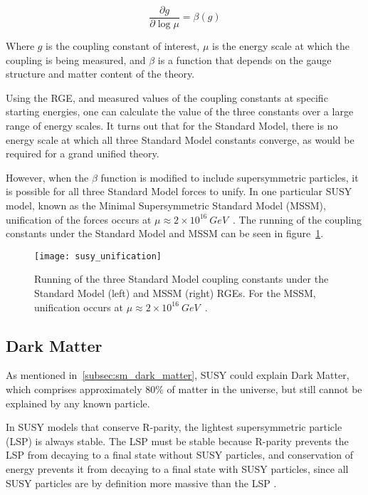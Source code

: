 \begin{equation}\label{eq:renorm_group}
    \frac{\partial g}{\partial \log \mu} = \beta(g)
\end{equation}

Where $g$ is the coupling constant of interest, $\mu$ is the energy scale at which the coupling is being measured,
and $\beta$ is a function that depends on the gauge structure and matter content of the theory.

Using the RGE, and measured values of the coupling constants at specific starting energies,
one can calculate the value of the three constants over a large range of energy scales.
It turns out that for the Standard Model, there is no energy scale at which all three Standard Model constants converge,
as would be required for a grand unified theory.

However, when the $\beta$ function is modified to include supersymmetric particles,
it is possible for all three Standard Model forces to unify.
In one particular SUSY model, known as the Minimal Supersymmetric Standard Model (MSSM),
unification of the forces occurs at $\mu \approx 2\times10^{16}~GeV$~\cite{susy-unification-1998}.
The running of the coupling constants under the Standard Model and MSSM can be seen in figure~\ref{fig:susy_unification}.

\begin{figure}[!ht]
    \centering
\texttt{[image: susy\_unification]}
\caption{Running of the three Standard Model coupling constants under the Standard Model (left) and MSSM (right) RGEs.
For the MSSM, unification occurs at $\mu\approx 2\times 10^{16}~GeV$~\cite{susy-pheno-2000}.}
\label{fig:susy_unification}
\end{figure}

\subsection{Dark Matter}\label{subsec:susy_dark_matter}

As mentioned in~\ref{subsec:sm_dark_matter}, SUSY could explain Dark Matter,
which comprises approximately $80\%$ of matter in the universe, but still cannot be explained by any known particle.

In SUSY models that conserve R-parity, the lightest supersymmetric particle (LSP) is always stable.
The LSP must be stable because R-parity prevents the LSP from decaying to a final state without SUSY particles,
and conservation of energy prevents it from decaying to a final state with SUSY particles,
since all SUSY particles are by definition more massive than the LSP .

